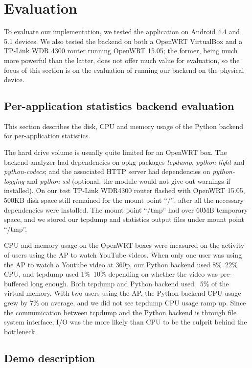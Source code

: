 \section{Evaluation}

To evaluate our implementation, we tested the application on Android 4.4 and 5.1 devices. We also tested the backend on both a OpenWRT VirtualBox and a TP-Link WDR 4300 router running OpenWRT 15.05; the former, being much more powerful than the latter, does not offer much value for evaluation, so the focus of this section is on the evaluation of running our backend on the physical device.

\subsection{Per-application statistics backend evaluation}

This section describes the disk, CPU and memory usage of the Python backend for per-application statistics. 

The hard drive volume is usually quite limited for an OpenWRT box. The backend analyzer had dependencies on opkg packages \textit{tcpdump}, \textit{python-light} and \textit{python-codecs}; and the associated HTTP server had dependencies on \textit{python-logging} and \textit{python-ssl} (optional, the module would not give out warnings if installed). On our test TP-Link WDR4300 router flashed with OpenWRT 15.05, 500KB disk space still remained for the mount point ``/'', after all the necessary dependencies were installed. The mount point ``/tmp'' had over 60MB temporary space, and we stored our tcpdump and statistics output files under mount point ``/tmp''.

CPU and memory usage on the OpenWRT boxes were measured on the activity of users using the AP to watch YouTube videos. When only one user was using the AP to watch a Youtube video at 360p, our Python backend used 8\%~22\% CPU, and tcpdump used 1\%~10\% depending on whether the video was pre-buffered long enough. Both tcpdump and Python backend used ~5\% of the virtual memory. With two users using the AP, the Python backend CPU usage grew by 7\% on average, and we did not see tcpdump CPU usage ramp up. Since the communication between tcpdump and the Python backend is through file system interface, I/O was the more likely than CPU to be the culprit behind the bottleneck.

\subsection{Demo description}

